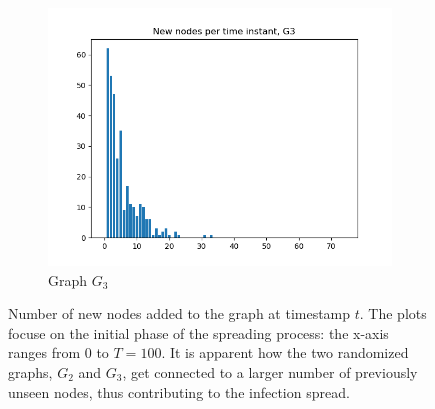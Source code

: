 \documentclass[letterpaper]{article}
\begin{document}
\begin{figure}
\begin{subfigure}[b]{0.32\textwidth}
        \includegraphics[width=\textwidth]{img/newNodesG3.png}
        \caption{Graph \(G_3\)}
	    \label{fig:degree_distribution_G3}
    \end{subfigure}
    \caption{\small{Number of new nodes added to the graph at timestamp \(t\). 
    The plots focuse on the initial phase of the spreading process: the x-axis ranges from 0 to \(T=100\). It is apparent how the two randomized graphs, \(G_2\) and \(G_3\), get connected to a larger number of previously unseen nodes, thus contributing to the infection spread. }}
    \label{fig:degree_distribution}
\end{figure}
\end{document}
